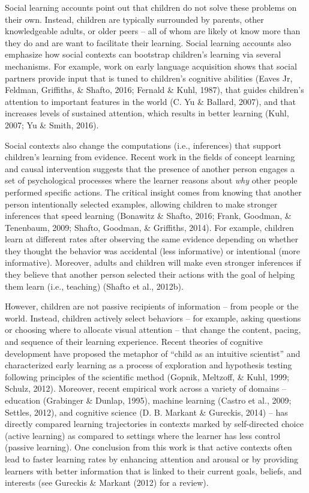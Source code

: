 \documentclass[oneside]{report}
\begin{document}
Social learning accounts point out that children do not solve these
problems on their own. Instead, children are typically surrounded by
parents, other knowledgeable adults, or older peers -- all of whom are
likely ot know more than they do and are want to facilitate their
learning. Social learning accounts also emphasize how social contexts
can bootstrap children's learning via several mechanisms. For example,
work on early language acquisition shows that social partners provide
input that is tuned to children's cognitive abilities (Eaves Jr,
Feldman, Griffiths, \& Shafto, 2016; Fernald \& Kuhl, 1987), that guides
children's attention to important features in the world (C. Yu \&
Ballard, 2007), and that increases levels of sustained attention, which
results in better learning (Kuhl, 2007; Yu \& Smith, 2016).

Social contexts also change the computations (i.e., inferences) that
support children's learning from evidence. Recent work in the fields of
concept learning and causal intervention suggests that the presence of
another person engages a set of psychological processes where the
learner reasons about \emph{why} other people performed specific
actions. The critical insight comes from knowing that another person
intentionally selected examples, allowing children to make stronger
inferences that speed learning (Bonawitz \& Shafto, 2016; Frank,
Goodman, \& Tenenbaum, 2009; Shafto, Goodman, \& Griffiths, 2014). For
example, children learn at different rates after observing the same
evidence depending on whether they thought the behavior was accidental
(less informative) or intentional (more informative). Moreover, adults
and children will make even stronger inferences if they believe that
another person selected their actions with the goal of helping them
learn (i.e., teaching) (Shafto et al., 2012b).

However, children are not passive recipients of information -- from
people or the world. Instead, children actively select behaviors -- for
example, asking questions or choosing where to allocate visual attention
-- that change the content, pacing, and sequence of their learning
experience. Recent theories of cognitive development have proposed the
metaphor of ``child as an intuitive scientist'' and characterized early
learning as a process of exploration and hypothesis testing following
principles of the scientific method (Gopnik, Meltzoff, \& Kuhl, 1999;
Schulz, 2012). Moreover, recent empirical work across a variety of
domains -- education (Grabinger \& Dunlap, 1995), machine learning
(Castro et al., 2009; Settles, 2012), and cognitive science (D. B.
Markant \& Gureckis, 2014) -- has directly compared learning
trajectories in contexts marked by self-directed choice (active
learning) as compared to settings where the learner has less control
(passive learning). One conclusion from this work is that active
contexts often lead to faster learning rates by enhancing attention and
arousal or by providing learners with better information that is linked
to their current goals, beliefs, and interests (see Gureckis \& Markant
(2012) for a review).
\end{document}
